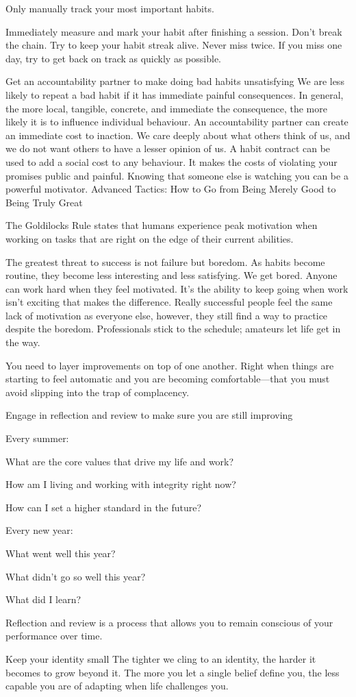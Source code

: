 \documentclass[10pt,twocolumn]{../notes}
\begin{document}
\Advice Only manually track your most important habits.

\Advice Immediately measure and mark your habit after finishing a session.
\Quote Don’t break the chain. Try to keep your habit streak alive.
\Quote Never miss twice. If you miss one day, try to get back on track as quickly as possible.

\Advice Get an accountability partner to make doing bad habits unsatisfying
\Fact We are less likely to repeat a bad habit if it has immediate painful consequences.
\Quote In general, the more local, tangible, concrete, and immediate the consequence, the more likely it is to influence individual behaviour.
\Quote An accountability partner can create an immediate cost to inaction. We care deeply about what others think of us, and we do not want others to have a lesser opinion of us.
\Quote A habit contract can be used to add a social cost to any behaviour. It makes the costs of violating your promises public and painful.
\Quote Knowing that someone else is watching you can be a powerful motivator.
Advanced Tactics: How to Go from Being Merely Good to Being Truly Great

\Advice The Goldilocks Rule states that humans experience peak motivation when working on tasks that are right on the edge of their current abilities.


\Quote The greatest threat to success is not failure but boredom.
\Quote As habits become routine, they become less interesting and less satisfying. We get bored.
\Quote Anyone can work hard when they feel motivated. It’s the ability to keep going when work isn’t exciting that makes the difference.
\Fact Really successful people feel the same lack of motivation as everyone else, however, they still find a way to practice despite the boredom.
\Quote Professionals stick to the schedule; amateurs let life get in the way.


\Advice You need to layer improvements on top of one another.
\Quote Right when things are starting to feel automatic and you are becoming comfortable—that you must avoid slipping into the trap of complacency.

\Advice Engage in reflection and review to make sure you are still improving
\begin{Examplelist}{Every summer: }
  \item What are the core values that drive my life and work?
  \item How am I living and working with integrity right now?
  \item How can I set a higher standard in the future?
\end{Examplelist}
\begin{Examplelist}{Every new year: }
  \item What went well this year?
  \item What didn’t go so well this year?
  \item What did I learn?
\end{Examplelist}
\Quote Reflection and review is a process that allows you to remain conscious of your performance over time.

\Advice Keep your identity small
\Quote The tighter we cling to an identity, the harder it becomes to grow beyond it.
\Quote The more you let a single belief define you, the less capable you are of adapting when life challenges you.
\end{document}
